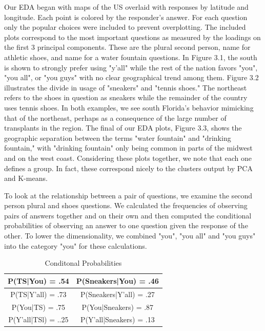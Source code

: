 \documentclass[english]{article}\usepackage{graphicx, color}
\numberwithin{equation}{section}
\numberwithin{figure}{section}
\begin{document}
Our EDA began with maps of the US overlaid with responses by latitude and longitude. Each point is colored by the responder's answer. For each question only the popular choices were included to prevent overplotting. The included plots correspond to the most important questions as measured by the loadings on the first 3 principal components. These are the plural second person, name for athletic shoes, and name for a water fountain questions. In Figure 3.1, the south is shown to strongly prefer using "y'all" while the rest of the nation favors "you", "you all", or "you guys" with no clear geographical trend among them. Figure 3.2 illustrates the divide in usage of "sneakers" and "tennis shoes." The northeast refers to the shoes in question as sneakers while the remainder of the country uses tennis shoes. In both examples, we see south Florida's behavior mimicking that of the northeast, perhaps as a consequence of the large number of transplants in the region. The final of our EDA plots, Figure 3.3, shows the geographic separation between the terms "water fountain" and "drinking fountain," with "drinking fountain" only being common in parts of the midwest and on the west coast. Considering these plots together, we note that each one defines a group. In fact, these correspond nicely to the clusters output by PCA and K-means. 

To look at the relationship between a pair of questions, we examine the second person plural and shoes questions. We calculated the frequencies of observing pairs of answers together and on their own and then computed the conditional probabilities of observing an answer to one question given the response of the other. To lower the dimensionality, we combined "you", "you all" and "you guys" into the category "you" for these calculations.

\begin{table}
\caption{Conditonal Probabilities}
\begin{center}
  \begin{tabular}{| c | c |}
    \hline
    P(TS|You) = .54 & P(Sneakers|You) = .46 \\ \hline
    P(TS|Y'all) = .73 & P(Sneakers|Y'all) = .27 \\ \hline
    P(You|TS) = .75 & P(You|Sneakers) = .87 \\ \hline
    P(Y'all|TSl) = ..25 & P(Y'all|Sneakers) = .13 \\ \hline
  \end{tabular}
\end{center}
\end{table}
\end{document}
